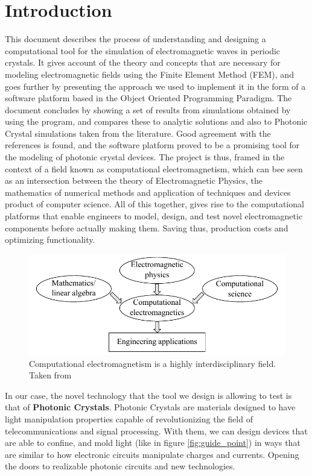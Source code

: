 \cleardoublepage {}
{}
\chapter*{Introduction}

This document describes the process of understanding and designing a computational tool for the simulation of electromagnetic waves in periodic crystals. It gives account of the  theory and concepts that are necessary for modeling electromagnetic fields using the Finite Element Method (FEM), and goes further by presenting the approach we used to implement it in the form of a software platform based in the Object Oriented Programming Paradigm. The document concludes by showing a set of results from simulations obtained by using the program, and compares these to analytic solutions and also to Photonic Crystal simulations taken from the literature. Good agreement with the references is found, and the software platform proved to be a promising tool for the modeling of photonic crystal devices.
The project is thus, framed in the context of a field known as computational electromagnetism, which can bee seen as an intersection between the theory of Electromagnetic Physics, the mathematics of numerical methods and application of techniques and devices product of computer science. All of this together, gives rise to the computational platforms that enable engineers to model, design, and test novel electromagnetic components before actually making them. Saving thus, production costs and optimizing functionality.  
\begin{figure}
\centering
\includegraphics[scale=1]{./img/interdisciplinary.pdf}
\caption{Computational electromagnetism is a highly interdisciplinary field. Taken from \cite{Jin2010}}
\label{fig:computational}
\end{figure}
In our case, the novel technology that the tool we design is allowing to test is that of \textbf{Photonic Crystals}. Photonic Crystals are materials designed to have light manipulation properties capable of revolutionizing the field of telecommunications and signal processing. With them, we can design devices that are able to confine, and mold light (like in figure \ref{fig:guide_point}) in ways that are similar to how electronic circuits manipulate charges and currents.  Opening the doors to realizable photonic circuits and new technologies.


